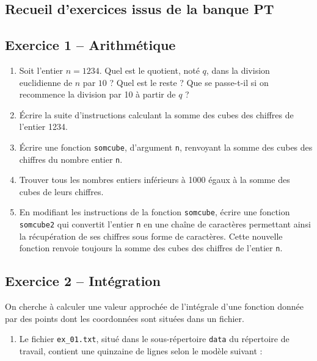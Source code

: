 \documentclass[10pt,fleqn]{article} %
\begin{document}
\begin{multicols}{2}
\section{Recueil d'exercices issus de la banque PT}

\subsection*{Exercice 1 -- Arithmétique}
\begin{enumerate}
\item Soit l’entier $n = 1234$. Quel est le quotient, noté $q$, dans la division euclidienne de $n$ par $10$ ? Quel est
le reste ? Que se passe-t-il si on recommence la division par 10 à partir de $q$ ?
\item Écrire la suite d’instructions calculant la somme des cubes des chiffres de l’entier 1234.
\item Écrire une fonction \texttt{somcube}, d’argument \texttt{n}, renvoyant la somme des cubes des chiffres du nombre
entier \texttt{n}.
\item Trouver tous les nombres entiers inférieurs à 1000 égaux à la somme des cubes de leurs chiffres.
\item En modifiant les instructions de la fonction \texttt{somcube}, écrire une fonction \texttt{somcube2} qui convertit
l’entier \texttt{n} en une chaîne de caractères permettant ainsi la récupération de ses chiffres sous forme de
caractères. Cette nouvelle fonction renvoie toujours la somme des cubes des chiffres de l’entier \texttt{n}.
\end{enumerate}


\subsection*{Exercice 2 -- Intégration}
On cherche à calculer une valeur approchée de l’intégrale d’une fonction donnée par des points dont les coordonnées sont situées dans un fichier.
\begin{enumerate}
\item Le fichier \texttt{ex\_01.txt}, situé dans le sous-répertoire \texttt{data} du répertoire de travail, contient une quinzaine de lignes selon le modèle suivant :

\begin{center}


\end{center}
\end{enumerate}
\end{multicols}
\end{document}
